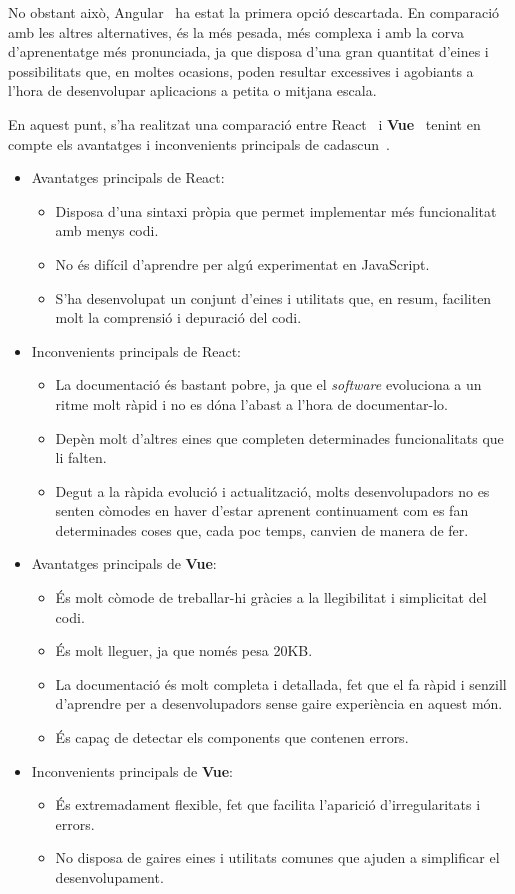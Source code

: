 \documentclass[a4paper,12pt]{ThesisStyle}
\begin{document}
No obstant això, Angular~\cite{Angular} ha estat la primera opció descartada. En comparació amb les altres alternatives, és la més pesada, més complexa i amb la corva d'aprenentatge més pronunciada, ja que disposa d'una gran quantitat d'eines i possibilitats que, en moltes ocasions, poden resultar excessives i agobiants a l'hora de desenvolupar aplicacions a petita o mitjana escala.

En aquest punt, s'ha realitzat una comparació entre React~\cite{React} i \textbf{Vue}~\cite{Vue} tenint en compte els avantatges i inconvenients principals de cadascun~\cite{ReactVsVue}.
\begin{itemize}
  \item Avantatges principals de React:
  \begin{itemize}
    \item Disposa d'una sintaxi pròpia que permet implementar més funcionalitat amb menys codi.
    \item No és difícil d'aprendre per algú experimentat en JavaScript.
    \item S'ha desenvolupat un conjunt d'eines i utilitats que, en resum, faciliten molt la comprensió i depuració del codi.
  \end{itemize}
  \item Inconvenients principals de React:
  \begin{itemize}
    \item La documentació és bastant pobre, ja que el \textit{software} evoluciona a un ritme molt ràpid i no es dóna l'abast a l'hora de documentar-lo.
    \item Depèn molt d'altres eines que completen determinades funcionalitats que li falten.
    \item Degut a la ràpida evolució i actualització, molts desenvolupadors no es senten còmodes en haver d'estar aprenent continuament com es fan determinades coses que, cada poc temps, canvien de manera de fer.
  \end{itemize}
  \item Avantatges principals de \textbf{Vue}:
  \begin{itemize}
    \item És molt còmode de treballar-hi gràcies a la llegibilitat i simplicitat del codi.
    \item És molt lleguer, ja que només pesa 20KB.
    \item La documentació és molt completa i detallada, fet que el fa ràpid i senzill d'aprendre per a desenvolupadors sense gaire experiència en aquest món.
    \item És capaç de detectar els components que contenen errors.
  \end{itemize}
  \item Inconvenients principals de \textbf{Vue}:
  \begin{itemize}
    \item És extremadament flexible, fet que facilita l'aparició d'irregularitats i errors.
    \item No disposa de gaires eines i utilitats comunes que ajuden a simplificar el desenvolupament.
  \end{itemize}
\end{itemize}
\end{document}

